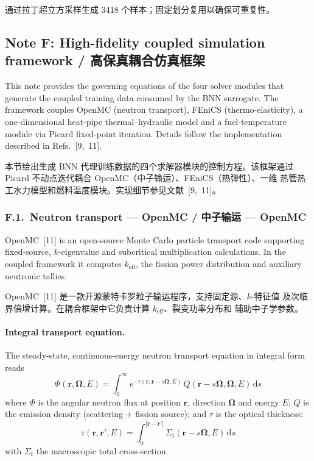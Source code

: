 \documentclass[11pt,a4paper]{article}
\newcommand{\keff}{\ensuremath{k_{\mathrm{eff}}}}
\begin{document}
通过拉丁超立方采样生成 3418 个样本；固定划分复用以确保可重复性。


\subsection{Note F: High-fidelity coupled simulation framework /
高保真耦合仿真框架}
\label{sec:noteF}

This note provides the governing equations of the four solver modules
that generate the coupled training data consumed by the BNN surrogate.
The framework couples OpenMC (neutron transport), FEniCS
(thermo-elasticity), a one-dimensional heat-pipe thermal--hydraulic
model and a fuel-temperature module via Picard fixed-point iteration.
Details follow the implementation described in Refs.~[9,~11].

本节给出生成 BNN 代理训练数据的四个求解器模块的控制方程。该框架通过
Picard 不动点迭代耦合 OpenMC（中子输运）、FEniCS（热弹性）、一维
热管热工水力模型和燃料温度模块。实现细节参见文献~[9,~11]。

\subsubsection*{F.1.~Neutron transport --- OpenMC /
中子输运 --- OpenMC}

OpenMC~[11] is an open-source Monte Carlo particle transport code
supporting fixed-source, $k$-eigenvalue and subcritical multiplication
calculations. In the coupled framework it computes \keff{}, the
fission power distribution and auxiliary neutronic tallies.

OpenMC~[11] 是一款开源蒙特卡罗粒子输运程序，支持固定源、$k$-特征值
及次临界倍增计算。在耦合框架中它负责计算 \keff{}、裂变功率分布和
辅助中子学参数。

\paragraph{Integral transport equation.}
The steady-state, continuous-energy neutron transport equation in
integral form reads
\begin{equation}
\Phi(\mathbf{r},\boldsymbol{\Omega},E)
= \int_{0}^{\infty}
  e^{-\tau(\mathbf{r},\mathbf{r}-s\boldsymbol{\Omega},E)}\,
  Q(\mathbf{r}-s\boldsymbol{\Omega},\boldsymbol{\Omega},E)\,\mathrm{d}s
\label{eq:integral_transport}
\end{equation}
where $\Phi$ is the angular neutron flux at position $\mathbf{r}$,
direction $\boldsymbol{\Omega}$ and energy $E$; $Q$ is the emission
density (scattering $+$ fission source); and $\tau$ is the optical
thickness:
\begin{equation}
\tau(\mathbf{r},\mathbf{r}',E)
= \int_{0}^{|\mathbf{r}-\mathbf{r}'|}
  \Sigma_t(\mathbf{r}-s\boldsymbol{\Omega},E)\,\mathrm{d}s
\end{equation}
with $\Sigma_t$ the macroscopic total cross-section.
\end{document}
